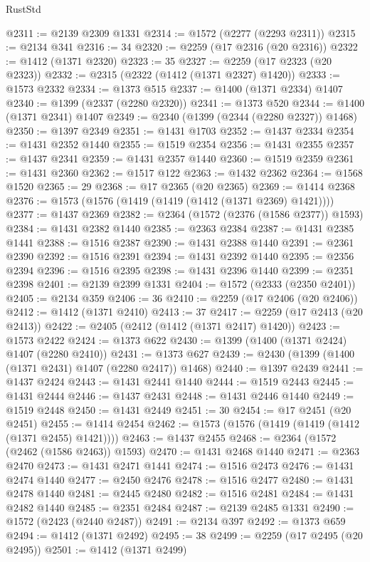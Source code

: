 \begin{lexlean}{RustStd}
\begin{coremodule}
@2311 := @2139 @2309 @1331
@2314 := @1572 (@2277 (@2293 @2311))
@2315 := @2134 @341
@2316 := 34
@2320 := @2259 (@17 @2316 (@20 @2316))
@2322 := @1412 (@1371 @2320)
@2323 := 35
@2327 := @2259 (@17 @2323 (@20 @2323))
@2332 := @2315 (@2322 (@1412 (@1371 @2327) @1420))
@2333 := @1573 @2332
@2334 := @1373 @515
@2337 := @1400 (@1371 @2334) @1407
@2340 := @1399 (@2337 (@2280 @2320))
@2341 := @1373 @520
@2344 := @1400 (@1371 @2341) @1407
@2349 := @2340 (@1399 (@2344 (@2280 @2327)) @1468)
@2350 := @1397 @2349
@2351 := @1431 @1703
@2352 := @1437 @2334
@2354 := @1431 @2352 @1440
@2355 := @1519 @2354
@2356 := @1431 @2355
@2357 := @1437 @2341
@2359 := @1431 @2357 @1440
@2360 := @1519 @2359
@2361 := @1431 @2360
@2362 := @1517 @122
@2363 := @1432 @2362
@2364 := @1568 @1520
@2365 := 29
@2368 := @17 @2365 (@20 @2365)
@2369 := @1414 @2368
@2376 := @1573 (@1576 (@1419 (@1419 (@1412 (@1371 @2369) @1421))))
@2377 := @1437 @2369
@2382 := @2364 (@1572 (@2376 (@1586 @2377)) @1593)
@2384 := @1431 @2382 @1440
@2385 := @2363 @2384
@2387 := @1431 @2385 @1441
@2388 := @1516 @2387
@2390 := @1431 @2388 @1440
@2391 := @2361 @2390
@2392 := @1516 @2391
@2394 := @1431 @2392 @1440
@2395 := @2356 @2394
@2396 := @1516 @2395
@2398 := @1431 @2396 @1440
@2399 := @2351 @2398
@2401 := @2139 @2399 @1331
@2404 := @1572 (@2333 (@2350 @2401))
@2405 := @2134 @359
@2406 := 36
@2410 := @2259 (@17 @2406 (@20 @2406))
@2412 := @1412 (@1371 @2410)
@2413 := 37
@2417 := @2259 (@17 @2413 (@20 @2413))
@2422 := @2405 (@2412 (@1412 (@1371 @2417) @1420))
@2423 := @1573 @2422
@2424 := @1373 @622
@2430 := @1399 (@1400 (@1371 @2424) @1407 (@2280 @2410))
@2431 := @1373 @627
@2439 := @2430 (@1399 (@1400 (@1371 @2431) @1407 (@2280 @2417)) @1468)
@2440 := @1397 @2439
@2441 := @1437 @2424
@2443 := @1431 @2441 @1440
@2444 := @1519 @2443
@2445 := @1431 @2444
@2446 := @1437 @2431
@2448 := @1431 @2446 @1440
@2449 := @1519 @2448
@2450 := @1431 @2449
@2451 := 30
@2454 := @17 @2451 (@20 @2451)
@2455 := @1414 @2454
@2462 := @1573 (@1576 (@1419 (@1419 (@1412 (@1371 @2455) @1421))))
@2463 := @1437 @2455
@2468 := @2364 (@1572 (@2462 (@1586 @2463)) @1593)
@2470 := @1431 @2468 @1440
@2471 := @2363 @2470
@2473 := @1431 @2471 @1441
@2474 := @1516 @2473
@2476 := @1431 @2474 @1440
@2477 := @2450 @2476
@2478 := @1516 @2477
@2480 := @1431 @2478 @1440
@2481 := @2445 @2480
@2482 := @1516 @2481
@2484 := @1431 @2482 @1440
@2485 := @2351 @2484
@2487 := @2139 @2485 @1331
@2490 := @1572 (@2423 (@2440 @2487))
@2491 := @2134 @397
@2492 := @1373 @659
@2494 := @1412 (@1371 @2492)
@2495 := 38
@2499 := @2259 (@17 @2495 (@20 @2495))
@2501 := @1412 (@1371 @2499)

\end{coremodule}
\end{lexlean}
